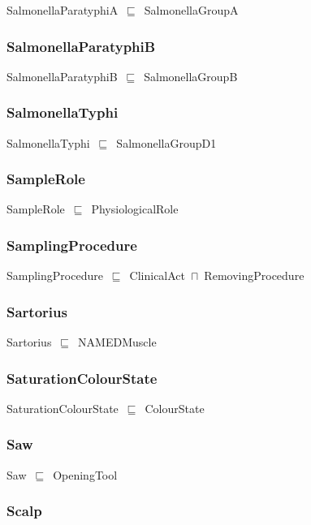 \documentclass{article}
\begin{document}
SalmonellaParatyphiA~\ensuremath{\sqsubseteq}~SalmonellaGroupA~

\subsubsection*{SalmonellaParatyphiB}

SalmonellaParatyphiB~\ensuremath{\sqsubseteq}~SalmonellaGroupB~

\subsubsection*{SalmonellaTyphi}

SalmonellaTyphi~\ensuremath{\sqsubseteq}~SalmonellaGroupD1~

\subsubsection*{SampleRole}

SampleRole~\ensuremath{\sqsubseteq}~PhysiologicalRole~

\subsubsection*{SamplingProcedure}

SamplingProcedure~\ensuremath{\sqsubseteq}~ClinicalAct~\ensuremath{\sqcap}~RemovingProcedure~

\subsubsection*{Sartorius}

Sartorius~\ensuremath{\sqsubseteq}~NAMEDMuscle~

\subsubsection*{SaturationColourState}

SaturationColourState~\ensuremath{\sqsubseteq}~ColourState~

\subsubsection*{Saw}

Saw~\ensuremath{\sqsubseteq}~OpeningTool~

\subsubsection*{Scalp}
\end{document}

